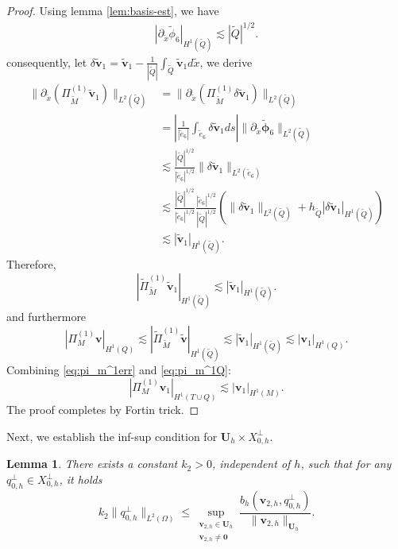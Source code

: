 \documentclass[a4paper,11pt,fleqn]{article}
\newtheorem{lemma}[theorem]{Lemma}
\numberwithin{equation}{section}
\begin{document}
\begin{proof}
    Using lemma \ref{lem:basis-est}, we have
    \begin{align*}
    	|\partial_{\tilde{x}}\tilde{\phi}_6|_{H^1(\tilde{Q})}\lesssim |\tilde{Q}|^{1/2}.
    \end{align*}
    consequently,  let $\delta \boldsymbol{\tilde{v}}_1 = \boldsymbol{\tilde{v}}_1 - \frac{1}{|\tilde{Q}|}\int_{\tilde{Q}}\boldsymbol{\tilde{v}}_1 d\tilde{x}$, we derive
	\begin{align*}
		\|\partial_{\tilde{x}} (\Pi^{(1)}_{\tilde{M}} \boldsymbol{\tilde{v}}_1)\|_{L^2(\tilde{Q})} 
		&=\|\partial_{\tilde{x}} (\Pi^{(1)}_{\tilde{M}} \delta\boldsymbol{\tilde{v}}_1)\|_{L^2(\tilde{Q})} \\
		&= \left| \frac{1}{|\tilde{e}_6|} \int_{\tilde{e}_6} \delta\boldsymbol{\tilde{v}}_1  ds \right| \|\partial_{\tilde{x}} \boldsymbol{\tilde{\phi}}_6\|_{L^2(\tilde{Q})} \\
		&\lesssim \frac{|\tilde{Q}|^{1/2}}{|\tilde{e}_6|^{1/2}}\|\delta\boldsymbol{\tilde{v}}_1\|_{L^2(\tilde{e}_6)}\\
		&\lesssim \frac{|\tilde{Q}|^{1/2}}{|\tilde{e}_6|^{1/2}} \frac{|\tilde{e}_6|^{1/2}}{|\tilde{Q}|^{1/2}}(\|\delta\boldsymbol{\tilde{v}}_1\|_{L^2(\tilde{Q})} + h_{\tilde{Q}}|\delta\boldsymbol{\tilde{v}}_1|_{H^1(\tilde{Q})} )\\
		&\lesssim |\boldsymbol{\tilde{v}}_1|_{H^1(\tilde{Q})}.
	\end{align*}
	Therefore,
	\begin{equation}\label{eq:pi_m^1Q}
		|\tilde{\Pi}^{(1)}_{\tilde{M}} \boldsymbol{\tilde{v}}_1|_{H^1(\tilde{Q})} \lesssim |\boldsymbol{\tilde{v}}_1|_{H^1(\tilde{Q})}.
	\end{equation}
	and furthermore
	\begin{equation*}
		|\Pi^{(1)}_M \boldsymbol{v}|_{H^1(Q)} \lesssim |\tilde{\Pi}^{(1)}_{\tilde{M}} \boldsymbol{\tilde{v}}|_{H^1(\tilde{Q})}
		\lesssim |\boldsymbol{\tilde{v}}_1|_{H^1(\tilde{Q})}\lesssim |\bm{v}_1|_{H^1(Q)}.
	\end{equation*}
	Combining \eqref{eq:pi_m^1err} and \eqref{eq:pi_m^1Q}:
	\begin{equation}\label{eq:pi_m^1QT}
		|\Pi^{(1)}_M \boldsymbol{v}_1|_{H^1(T \cup Q)} \lesssim |\boldsymbol{v}_1|_{H^1(M)}.
	\end{equation}
	The proof completes by Fortin trick.
\end{proof}


Next, we establish the inf-sup condition for $\boldsymbol{U}_h \times X^{\perp}_{0,h}$.
\begin{lemma}\label{le:sup2}
	There exists a constant $k_2 > 0$, independent of $h$, such that for any $q^{\bot}_{0,h} \in X^{\bot}_{0,h}$, it holds
	\begin{equation}
		k_2\| q_{0,h}^{\perp} \|_{L^2(\Omega)} \leq \sup_{\substack{\boldsymbol{v}_{2,h} \in \boldsymbol{U}_{h} \\ \boldsymbol{v}_{2,h} \neq \bm{0}}} \frac{b_h(\boldsymbol{v}_{2,h}, q_{0,h}^{\perp})}{\|\boldsymbol{v}_{2,h}\|_{\boldsymbol{U}_{h}}}.
	\end{equation}
\end{lemma}
\end{document}
